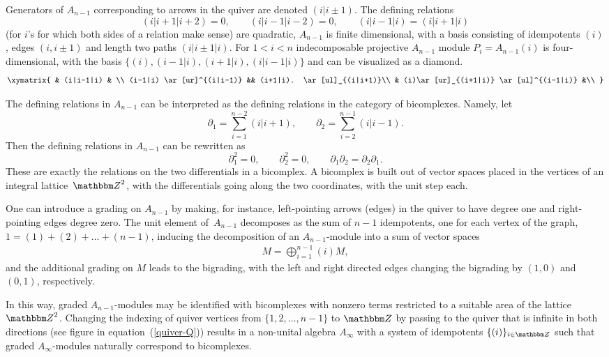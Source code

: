 \documentclass[10pt,a4paper]{amsart}
\theoremstyle{definition}
\numberwithin{equation}{section}
\def\Z{{\mathbbm Z}}
\begin{document}
Generators of $A_{n-1}$ corresponding to arrows in the quiver are
denoted $(i|i\pm 1)$. The defining relations
\[
(i|i+1|i+2)=0,\qquad (i|i-1|i-2)=0,\qquad (i|i-1|i)=(i|i+1|i)
\]
(for $i$'s for which both sides of a relation make sense) are quadratic,
$A_{n-1}$ is finite dimensional, with a basis consisting of idempotents $(i)$,
edges $(i,i\pm 1)$ and length two paths $(i|i\pm 1|i)$. For $1< i < n$ indecomposable projective $A_{n-1}$ module $P_i = A_{n-1}(i)$ is four-dimensional, with the basis $\{(i),(i-1|i),(i+1|i),(i|i-1|i)\}$ and
can be visualized as a diamond.
\[
\xymatrix{
& (i|i-1|i) & \\
(i-1|i) \ar[ur]^{(i|i-1)} && (i+1|i). \ar[ul]_{(i|i+1)}\\
& (i)\ar[ur]_{(i+1|i)} \ar[ul]^{(i-1|i)} &\\
}
\]

The defining relations in $A_{n-1}$ can be interpreted as the defining relations in the category of bicomplexes. Namely, let
\[
\partial_1 = \sum_{i=1}^{n-2}(i|i+1), \qquad
\partial_2 = \sum_{i=2}^{n-1}(i|i-1).
\]
Then the defining relations in $A_{n-1}$ can be rewritten as
\[ \partial_1^2=0, \qquad \partial_2^2=0, \qquad \partial_1\partial_2 =
\partial_2\partial_1.
\]
These are exactly the relations on the two differentials in a bicomplex. A bicomplex is built out of vector spaces placed in the vertices of an integral lattice~$\Z^2$, with the differentials going along the two coordinates, with the unit step each.

One can introduce a grading on $A_{n-1}$ by making, for instance, left-pointing arrows (edges) in the quiver to have degree one and right-pointing edges degree zero. The unit element of~$A_{n-1}$ decomposes as the sum of $n-1$ idempotents, one for each vertex of the graph,
$1 = (1)+(2)+\dots + (n-1)$, inducing the decomposition of an $A_{n-1}$-module into a sum of vector spaces
\begin{gather*} M = \bigoplus_{i=1}^{n-1} (i) M ,\end{gather*}
and the additional grading on $M$ leads to the bigrading, with the left and right directed edges changing the bigrading by $(1,0)$ and $(0,1)$, respectively.

In this way, graded $A_{n-1}$-modules may be identified with bicomplexes with nonzero terms restricted to a suitable area of the lattice $\Z^2$. Changing the indexing of quiver vertices from $\{1,2,\dots, n-1\}$ to $\Z$ by passing
to the quiver that is infinite in both directions (see figure in equation~(\ref{quiver-Q}))
results in a non-unital algebra $A_{\infty}$ with a system of idempotents
$\{(i)\}_{i \in \Z}$ such that graded $A_{\infty}$-modules naturally correspond to bicomplexes.
\end{document}
